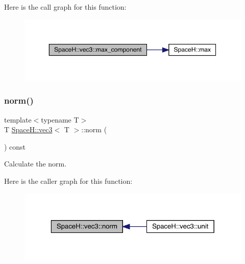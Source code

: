Here is the call graph for this function\+:
\nopagebreak
\begin{figure}[H]
\begin{center}
\leavevmode
\includegraphics[width=350pt]{struct_space_h_1_1vec3_a5bf7ae47f97a2269748d66933d719bd9_cgraph}
\end{center}
\end{figure}
\mbox{\label{struct_space_h_1_1vec3_aeec869b0802a468ffff325efb2d0e780}} 
\subsubsection{\texorpdfstring{norm()}{norm()}\hspace{0.1cm}{\footnotesize\ttfamily [1/4]}}
{\footnotesize\ttfamily template$<$typename T$>$ \\
T \mbox{\hyperlink{struct_space_h_1_1vec3}{Space\+H\+::vec3}}$<$ T $>$\+::norm (\begin{DoxyParamCaption}{ }\end{DoxyParamCaption}) const\hspace{0.3cm}{\ttfamily [inline]}}



Calculate the norm. 

Here is the caller graph for this function\+:
\nopagebreak
\begin{figure}[H]
\begin{center}
\leavevmode
\includegraphics[width=323pt]{struct_space_h_1_1vec3_aeec869b0802a468ffff325efb2d0e780_icgraph}
\end{center}
\end{figure}
\mbox{\label{struct_space_h_1_1vec3_aeec869b0802a468ffff325efb2d0e780}} 
